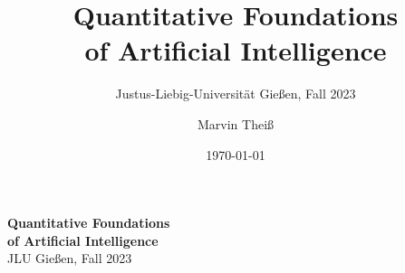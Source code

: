 
\subject{Lecture Notes}
\title{Quantitative Foundations\\ of Artificial Intelligence}
\subtitle{Justus-Liebig-Universit\"at Gie{\ss}en, Fall 2023}
\author{Marvin Thei{\ss}}
\date{\today}



\begin{titlepage}
    \begin{flushright}
        {
            \bfseries\fontsize{40}{40}\selectfont
            Quantitative Foundations \\
            of Artificial Intelligence \\[24pt]
        }
        {
            \fontsize{32}{36}\selectfont
            JLU Gie{\ss}en, Fall 2023
        }
    \end{flushright}

\end{titlepage}

\cleardoublepage
\restoregeometry
{}

\uppertitleback{
    This work \copyright{} 2024 by \href{https://github.com/mrvnthss}{Marvin Thei{\ss}} is licensed under \href{http://creativecommons.org/licenses/by-nc-sa/4.0/?ref=chooser-v1}{CC BY-NC-SA 4.0} \ccbyncsa \\

    You are free to distribute, remix, adapt, and build upon the material in any medium or format. You must give \href{https://creativecommons.org/licenses/by-nc-sa/4.0/?ref=chooser-v1\#ref-appropriate-credit}{appropriate credit}, provide a link to the license, and \href{https://creativecommons.org/licenses/by-nc-sa/4.0/?ref=chooser-v1\#ref-indicate-changes}{indicate if changes were made}. You may do so in any reasonable manner, but not in any way that suggests the licensor endorses you or your use. You may not use the material for \href{https://creativecommons.org/licenses/by-nc-sa/4.0/?ref=chooser-v1\#ref-commercial-purposes}{commercial purposes}. If you remix, transform, or build upon the material, you must distribute your contributions under the \href{https://creativecommons.org/licenses/by-nc-sa/4.0/?ref=chooser-v1\#ref-same-license}{same license} as the original.
}

